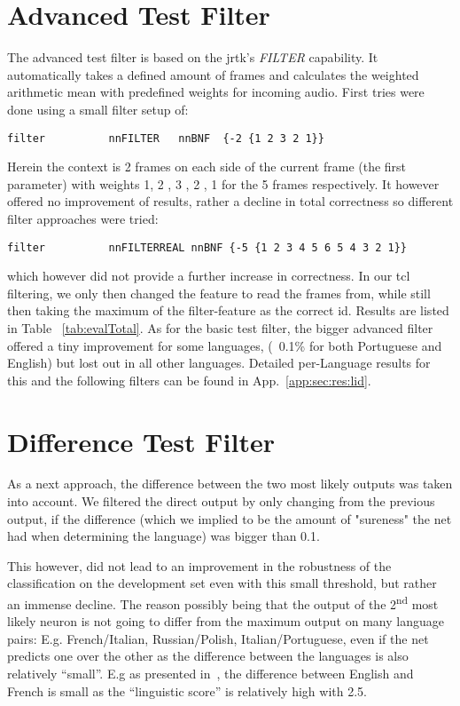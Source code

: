 \section{Advanced Test Filter}
\label{sec:eval:advanced}
The advanced test filter is based on the jrtk's \textit{FILTER} capability. It automatically takes a defined amount of frames and calculates the weighted arithmetic mean with predefined weights for incoming audio. First tries were done using a small filter setup of:
\begin{verbatim}
filter          nnFILTER   nnBNF  {-2 {1 2 3 2 1}}
\end{verbatim}  Herein the context is 2 frames on each side of the current frame (the first parameter) with weights 1, 2 , 3 , 2 , 1 for the 5 frames respectively.  It however offered no improvement of results, rather a decline in total correctness so different filter approaches were tried:
\begin{verbatim}
filter          nnFILTERREAL nnBNF {-5 {1 2 3 4 5 6 5 4 3 2 1}}
\end{verbatim}
which however did not provide a further increase in correctness. In our tcl filtering, we only then changed the feature to read the frames from, while still then taking the maximum of the filter-feature as the correct id. Results are listed in Table ~\ref{tab:evalTotal}. As for the basic test filter, the bigger advanced filter offered a tiny improvement for some languages, (~0.1\% for both Portuguese and English) but lost out in all other languages. Detailed per-Language results for this and the following filters can be found in App.~\ref{app:sec:res:lid}.


\section{Difference Test Filter}
\label{sec:eval:variance}
As a next approach, the difference between the two most likely outputs was taken into account. We filtered the direct output by only changing from the previous output, if the difference (which we implied to be the amount of "sureness" the net had when determining the language) was bigger than 0.1. 

This however, did not lead to an improvement in the robustness of the classification on the development set even with this small threshold, but rather an immense decline. The reason possibly being that the output of the 2\textsuperscript{nd} most likely neuron is not going to differ from the maximum output on many language pairs: E.g. French/Italian, Russian/Polish, Italian/Portuguese,  even if the net predicts one over the other as the difference between the languages is also relatively ``small''. E.g as presented in~\cite{doi:10.1080/14790710508668395}, the difference between English and French is small as the ``linguistic score'' is relatively high with 2.5. 

